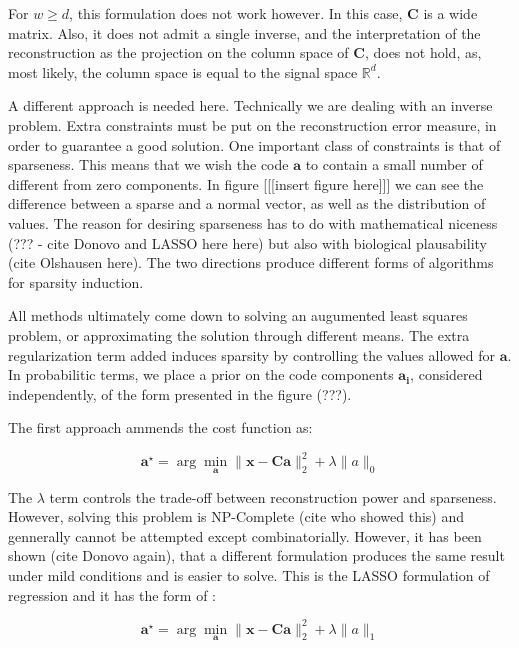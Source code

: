 \documentclass[12pt,a4paper,oneside,english]{UPBThesis}
\newcommand{\hcsignalspace}{\mathbb{R}^d}
\begin{document}
For $w \ge d$, this formulation does not work however. In this case, $\textbf{C}$ is a wide matrix. Also, it does not admit a single inverse, and the interpretation of the reconstruction as the projection on the column space of $\textbf{C}$, does not hold, as, most likely, the column space is equal to the signal space $\hcsignalspace$.

A different approach is needed here. Technically we are dealing with an inverse problem. Extra constraints must be put on the reconstruction error measure, in order to guarantee a good solution. One important class of constraints is that of sparseness. This means that we wish the code $\textbf{a}$ to contain a small number of different from zero components. In figure [[[insert figure here]]] we can see the difference between a sparse and a normal vector, as well as the distribution of values. The reason for desiring sparseness has to do with mathematical niceness (??? - cite Donovo and LASSO here here) but also with biological plausability (cite Olshausen here). The two directions produce different forms of algorithms for sparsity induction.

All methods ultimately come down to solving an augumented least squares problem, or approximating the solution through different means. The extra regularization term added induces sparsity by controlling the values allowed for $\mathbf{a}$. In probabilitic terms, we place a prior on the code components $\mathbf{a_i}$, considered independently, of the form presented in the figure (???).

The first approach ammends the cost function as:

\begin{equation}
\textbf{a}^{\star} = \arg\min_{\textbf{a}} \| \textbf{x} - \textbf{C}\textbf{a}\|_2^2 + \lambda \|a\|_0
\label{eq:SparseProblem}
\end{equation}

The $\lambda$ term controls the trade-off between reconstruction power and sparseness. However, solving this problem is NP-Complete (cite who showed this) and gennerally cannot be attempted except combinatorially. However, it has been shown (cite Donovo again), that a different formulation produces the same result under mild conditions and is easier to solve. This is the LASSO formulation of regression and it has the form of :

\begin{equation}
\textbf{a}^{\star} = \arg\min_{\textbf{a}} \| \textbf{x} - \textbf{C}\textbf{a}\|_2^2 + \lambda \|a\|_1
\end{equation}
\end{document}
